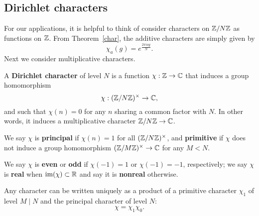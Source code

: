\subsection{Dirichlet characters}\label{dir-char-ss}
For our applications, it is helpful to think of consider characters on $\mathbb{Z}/N\mathbb{Z}$ as functions on $\mathbb{Z}$. From Theorem~\ref{char}, the additive characters are simply given by 
\[
\chi_a(g)=e^{\frac{2\pi i ag}{N}}.
\]
Next we consider multiplicative characters.
\begin{df}\label{dir-char}
A \textbf{Dirichlet character} of level $N$ is a function $\chi:\mathbb{Z}\to \mathbb{C}$ that induces a group homomorphism
\[
\chi:(\mathbb{Z}/N\mathbb{Z})^{\times}\to \mathbb{C},
\]
and such that $\chi(n)=0$ for any $n$ sharing a common factor with $N$. In other words, it induces a multiplicative character $\mathbb{Z}/N\mathbb{Z}\to \mathbb{C}$.

We say $\chi$ is \textbf{principal} if $\chi(n)=1$ for all $(\mathbb{Z}/N\mathbb{Z})^{\times}$, and \textbf{primitive} if $\chi$ does not induce a group homomorphism $(\mathbb{Z}/M\mathbb{Z})^{\times}\to \mathbb{C}$ for any $M<N$.

We say $\chi$ is \textbf{even} or \textbf{odd} if $\chi(-1)=1$ or $\chi(-1)=-1$, respectively; we say $\chi$ is \textbf{real} when $\text{im}(\chi)\subset\mathbb{R}$ and say it is \textbf{nonreal} otherwise.
\end{df}
Any character can be written uniquely as a product of a primitive character $\chi_1$ of level $M\mid N$ and the principal character of level $N$:
\[
\chi=\chi_1\chi_0.
\]
